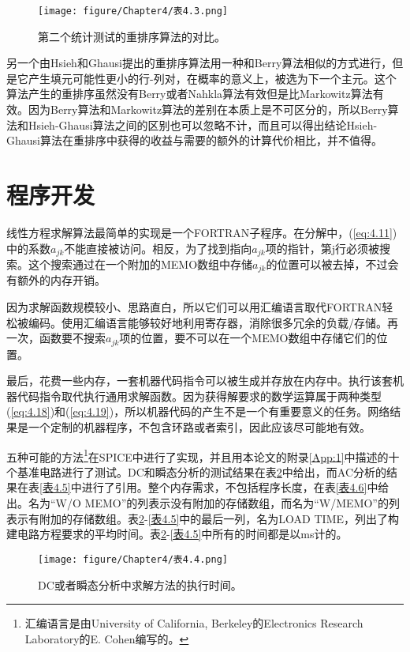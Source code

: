 \begin{figure}[htbp]
\small
    \centering
    \texttt{[image: figure/Chapter4/表4.3.png]}
    \caption{第二个统计测试的重排序算法的对比。}
    \label{表4.3}
\end{figure}

另一个由Hsieh和Ghausi\cite{ref-53}提出的重排序算法用一种和Berry算法相似的方式进行，但是它产生填元可能性更小的行-列对，在概率的意义上，被选为下一个主元。这个算法产生的重排序虽然没有Berry或者Nahkla算法有效但是比Markowitz算法有效。因为Berry算法和Markowitz算法的差别在本质上是不可区分的，所以Berry算法和Hsieh-Ghausi算法之间的区别也可以忽略不计，而且可以得出结论Hsieh-Ghausi算法在重排序中获得的收益与需要的额外的计算代价相比，并不值得。

\section{程序开发}
线性方程求解算法最简单的实现是一个FORTRAN子程序。在分解中，(\ref{eq:4.11})中的系数$a_{jk}$不能直接被访问。相反，为了找到指向$a_{jk}$项的指针，第j行必须被搜索。这个搜索通过在一个附加的MEMO数组中存储$a_{jk}$的位置可以被去掉，不过会有额外的内存开销。

因为求解函数规模较小、思路直白，所以它们可以用汇编语言取代FORTRAN轻松被编码。使用汇编语言能够较好地利用寄存器，消除很多冗余的负载/存储。再一次，函数要不搜索$a_{jk}$项的位置，要不可以在一个MEMO数组中存储它们的位置。

最后，花费一些内存，一套机器代码指令可以被生成并存放在内存中。执行该套机器代码指令取代执行通用求解函数。因为获得解要求的数学运算属于两种类型(\ref{eq:4.18})和(\ref{eq:4.19})，所以机器代码的产生不是一个有重要意义的任务。网络结果是一个定制的机器程序，不包含环路或者索引，因此应该尽可能地有效。

五种可能的方法\footnote{汇编语言是由University of California, Berkeley的Electronics Research Laboratory的E. Cohen编写的。}在SPICE中进行了实现，并且用本论文的附录\ref{App:1}中描述的十个基准电路进行了测试。DC和瞬态分析的测试结果在表\ref{表4.4}中给出，而AC分析的结果在表\ref{表4.5}中进行了引用。整个内存需求，不包括程序长度，在表\ref{表4.6}中给出。名为“W/O MEMO”的列表示没有附加的存储数组，而名为“W/MEMO”的列表示有附加的存储数组。表\ref{表4.4}-\ref{表4.5}中的最后一列，名为LOAD TIME，列出了构建电路方程要求的平均时间。表\ref{表4.4}-\ref{表4.5}中所有的时间都是以ms计的。
\begin{figure}[htbp]
\small
    \centering
    \texttt{[image: figure/Chapter4/表4.4.png]}
    \caption{DC或者瞬态分析中求解方法的执行时间。}
    \label{表4.4}
\end{figure}

